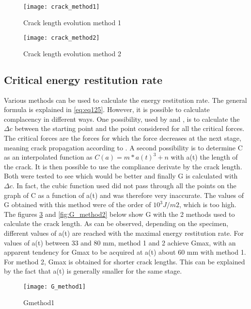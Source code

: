 \begin{figure}[htp]
	\centering
	\texttt{[image: crack\_method1]}
	\caption{Crack length evolution method 1}
	\label{fig:crack_method1}
\end{figure}

\begin{figure}[htp]
	\centering
	\texttt{[image: crack\_method2]}
	\caption{Crack length evolution method 2}
	\label{fig:crack_method2}
\end{figure}

\subsection{Critical energy restitution rate}

Various methods can be used to calculate the energy restitution rate. The general formula is explained in \ref{eq:eq125}. However, it is possible to calculate complacency in different ways. One possibility, used by \cite{Odounga2018phd} and \cite{MoutouPitti2008}, is to calculate the $\Delta c$ between the starting point and the point considered for all the critical forces. The critical forces are the forces for which the force decreases at the next stage, meaning crack propagation according to \cite{MoutouPitti2008}. A second possibility is to determine C as an interpolated function as $C(a)=m*a(t)^3+n$ with a(t) the length of the crack.  It is then possible to use the compliance derivate by the crack length. Both were tested to see which would be better and finally G is calculated with $\Delta c$. In fact, the cubic function used did not pass through all the points on the graph of C as a function of a(t) and was therefore very inaccurate. The values of G obtained with this method were of the order of $10^3 J/m2$, which is too high.
The figures \ref{fig:G_method1} and \ref{fig:G_method2} below show G with the 2 methods used to calculate the crack length.
As can be observed, depending on the specimen, different values of a(t) are reached with the maximal energy restitution rate. For values of a(t) between 33 and 80 mm, method 1 and 2 achieve Gmax, with an apparent tendency for Gmax to be acquired at a(t) about 60 mm with method 1. For method 2, Gmax is obtained for shorter crack lengths. This can be explained by the fact that a(t) is generally smaller for the same stage.

\begin{figure}[htp]
	\centering
	\texttt{[image: G\_method1]}
	\caption{Gmethod1}
	\label{fig:G_method1}
\end{figure}

